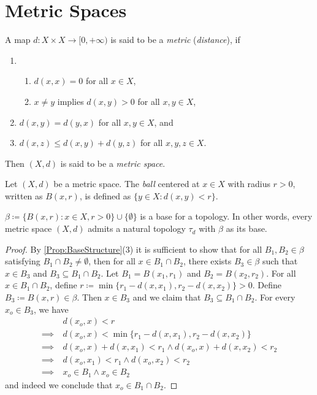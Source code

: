 \documentclass[screen]{techreport}
\numberwithin{equation}{section}
\begin{document}
\section{Metric Spaces}

\begin{definition}\label{De:Metrics}
	A map $d : X \times X \to [0,+\infty)$ is said to be a \emph{metric} (\emph{distance}), if
	\begin{enumerate}
		\item\
		\begin{enumerate}
			\item $d(x,x) = 0$ for all $x \in X$,
			\item $x \neq y$ implies $d(x,y) > 0$ for all $x,y \in X$,
		\end{enumerate}
		\item $d(x,y) = d(y,x)$ for all $x,y \in X$, and
		\item $d(x,z) \le d(x,y) + d(y,z)$ for all $x,y,z \in X$.
	\end{enumerate}
	Then $(X,d)$ is said to be a \emph{metric space}.
\end{definition}

\begin{definition}\label{De:OpenBalls}
	Let $(X,d)$ be a metric space.
	The \emph{ball} centered at $x \in X$ with radius $r > 0$, written as $B(x,r)$, is defined as $\{ y \in X : d(x,y) < r\}$.
\end{definition}

\begin{lemma}\label{Lem:MetricInduceTop}
	$\beta \coloneqq \{ B(x,r) : x \in X, r > 0 \} \cup \{ \emptyset \}$ is a base for a topology.
	In other words, every metric space $(X,d)$ admits a natural topology $\tau_d$ with $\beta$ as its base.
\end{lemma}
\begin{proof}
	By \cref{Prop:BaseStructure}(3) it is sufficient to show that for all $B_1,B_2 \in \beta$ satisfying $B_1 \cap B_2 \neq \emptyset$, then for all $x \in B_1 \cap B_2$, there exists $B_3 \in \beta$ such that $x \in B_3$ and $B_3 \subseteq B_1 \cap B_2$.
	Let $B_1 = B(x_1,r_1)$ and $B_2 = B(x_2,r_2)$.
	For all $x \in B_1 \cap B_2$, define $r \coloneqq \min \{ r_1 - d(x,x_1), r_2 - d(x,x_2) \} > 0$.
	Define $B_3 \coloneqq B(x,r) \in \beta$.
	Then $x \in B_3$ and we claim that $B_3 \subseteq B_1 \cap B_2$.
	For every $x_o \in B_3$, we have
	\begin{align*}
		& d(x_o,x) < r \\
		\implies~ & d(x_o,x) < \min \{ r_1 - d(x,x_1), r_2 - d(x,x_2) \} \\
		\implies~ & d(x_o,x) + d(x,x_1) < r_1 \wedge d(x_o,x)+d(x,x_2) < r_2 \\
		\implies~ & d(x_o,x_1) < r_1 \wedge d(x_o,x_2) < r_2 \\
		\implies~ & x_o \in B_1 \wedge x_o \in B_2
	\end{align*}
	and indeed we conclude that $x_o \in B_1 \cap B_2$.
\end{proof}
\end{document}
